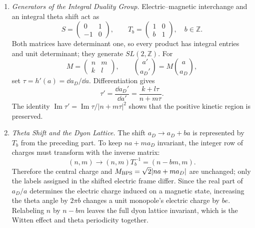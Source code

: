 \begin{enumerate}
  \begin{enumerate}
    \item \emph{Generators of the Integral Duality Group.}
    Electric--magnetic interchange and an integral theta shift act as
      \[
        S=\begin{pmatrix}0&1\\-1&0\end{pmatrix},
        \qquad
        T_b=\begin{pmatrix}1&0\\b&1\end{pmatrix},
        \quad b\in\mathbb Z.
      \]
      Both matrices have determinant one, so every product has integral
      entries and unit determinant; they generate \(SL(2,\mathbb Z)\).
      For
      \[
        M=\begin{pmatrix}n&m\\k&l\end{pmatrix},
        \qquad
        \binom{a'}{a_D'}=M\binom{a}{a_D},
      \]
      set \(\tau=h'(a)=\dd a_D/\dd a\).  Differentiation gives
      \[
        \tau'=\frac{\dd a_D'}{\dd a'}
          =\frac{k+l\tau}{n+m\tau}.
      \]
      The identity
      \(\operatorname{Im}\tau'
       =\operatorname{Im}\tau/\lvert n+m\tau\rvert^2\)
      shows that the positive kinetic region is preserved.
    \item \emph{Theta Shift and the Dyon Lattice.}
    The shift \(a_D\to a_D+ba\) is represented by \(T_b\) from the
      preceding part.  To keep
      \(na+ma_D\) invariant, the integer row of charges must transform with
      the inverse matrix:
      \[
        (n,m)\longrightarrow(n,m)T_b^{-1}=(n-bm,m).
      \]
      Therefore the central charge and
      \(M_{\rm BPS}=\sqrt2\lvert na+ma_D\rvert\) are unchanged; only the
      labels assigned in the shifted electric frame differ.  Since the real
      part of \(a_D/a\) determines the electric charge induced on a magnetic
      state, increasing the theta angle by \(2\pi b\) changes a unit
      monopole's electric charge by \(be\).  Relabeling \(n\) by
      \(n-bm\) leaves the full dyon lattice invariant, which is the Witten
      effect and theta periodicity together.
  \end{enumerate}


\end{enumerate}
